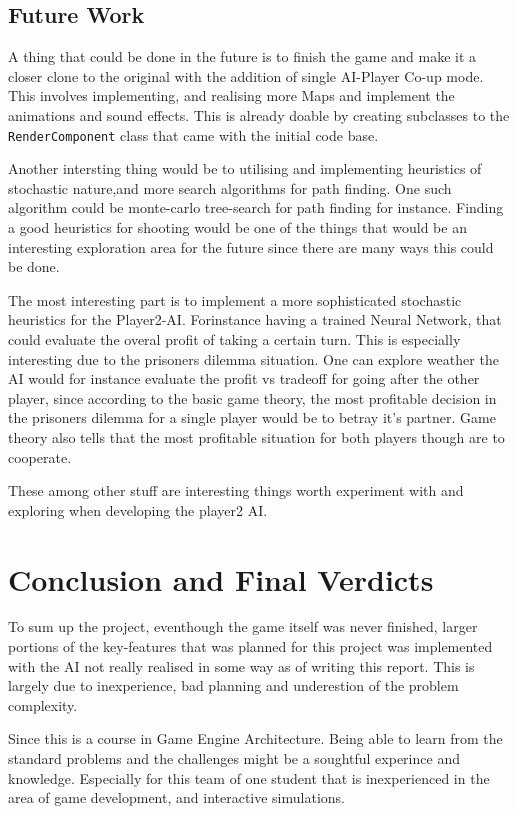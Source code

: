 \documentclass{article}
\begin{document}
  \subsection{Future Work}
  A thing that could be done in the future is to finish the game and make it a closer clone to the original with the addition of single AI-Player Co-up mode. This involves implementing, and realising more Maps and implement the animations and sound effects. This is already doable by creating subclasses to the \texttt{RenderComponent} class that came with the initial code base.

  Another intersting thing would be to utilising and implementing heuristics of stochastic nature,and more search algorithms for path finding. One such algorithm could be monte-carlo tree-search for path finding for instance. Finding a good heuristics for shooting would be one of the things that would be an interesting exploration area for the future since there are many ways this could be done.

  The most interesting part is to implement a more sophisticated stochastic heuristics for the Player2-AI. Forinstance having a trained Neural Network, that could evaluate the overal profit of taking a certain turn. This is especially interesting due to the prisoners dilemma situation. One can explore weather the AI would for instance evaluate the profit vs tradeoff for going after the other player, since according to the basic game theory, the most profitable decision in the prisoners dilemma for a single player would be to betray it's partner. Game theory also tells that the most profitable situation for both players though are to cooperate.

  These among other stuff are interesting things worth experiment with and exploring when developing the player2 AI.

  \section{Conclusion and Final Verdicts}

  To sum up the project, eventhough the game itself was never finished, larger portions of the key-features that was planned for this project was implemented with the AI not really realised in some way as of writing this report. This is largely due to inexperience, bad planning and underestion of the problem complexity.

  Since this is a course in Game Engine Architecture. Being able to learn from the standard problems and the challenges might be a soughtful experince and knowledge. Especially for this team of one student that is inexperienced in the area of game development, and interactive simulations.
\end{document}

